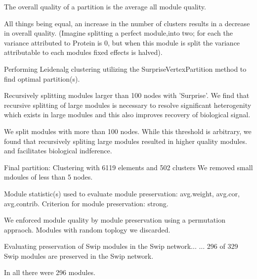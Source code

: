 \documentclass[11pt]{elife}\usepackage[]{graphicx}\usepackage[]{color}
\begin{document}

The overall quality of a partition is the average all module quality.

All things being equal, an increase in the number of clusters results in a
decrease in overall quality. (Imagine splitting a perfect module,into two; for
each the variance attributed to Protein is 0, but when this module is split the
variance attributable to each modules fixed effects is halved).

Performing Leidenalg clustering utilizing the 
SurpriseVertexPartition method to find optimal partition(s).

Recursively splitting modules larger than 100 nodes with 'Surprise'.
We find that recursive splitting of large modules is necessary to resolve 
significant heterogenity which exists in large modules and this also improves 
recovery of biological signal.

We split modules with more than 100 nodes. While this threshold is arbitrary, we
found that recursively spliting large modules resulted in higher quality
modules. and facilitates biological indference.

Final partition:  Clustering with 6119 elements and 502 clusters
We removed small mdoules of less than 5 nodes.

Module statistic(s) used to evaluate module  preservation:
avg.weight, avg.cor, avg.contrib.
Criterion for module preservation: strong.

We enforced module quality by module preservation using a permutation appraoch.
Modules with random toplogy we discarded. 


Evaluating  preservation of Swip modules in the Swip network...
... 296 of 329 Swip modules are preserved in the Swip network.

In all there were 296 modules.



\end{document}
